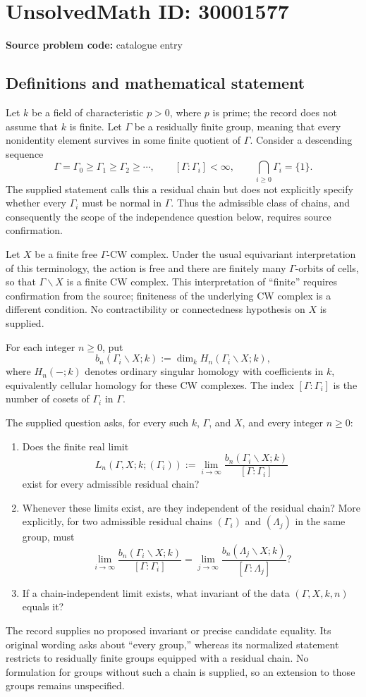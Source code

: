 \documentclass[11pt]{article}
\begin{document}
\section*{UnsolvedMath ID: 30001577}
\textbf{Source problem code:} catalogue entry
\subsection{Definitions and mathematical statement}
Let \(k\) be a field of characteristic \(p>0\), where \(p\) is prime; the record does not assume that \(k\) is finite. Let \(\Gamma\) be a residually finite group, meaning that every nonidentity element survives in some finite quotient of \(\Gamma\). Consider a descending sequence
\[
\Gamma=\Gamma_0\geq\Gamma_1\geq\Gamma_2\geq\cdots,
\qquad [\Gamma:\Gamma_i]<\infty,
\qquad \bigcap_{i\geq0}\Gamma_i=\{1\}.
\]
The supplied statement calls this a residual chain but does not explicitly specify whether every \(\Gamma_i\) must be normal in \(\Gamma\). Thus the admissible class of chains, and consequently the scope of the independence question below, requires source confirmation.

Let \(X\) be a finite free \(\Gamma\)-CW complex. Under the usual equivariant interpretation of this terminology, the action is free and there are finitely many \(\Gamma\)-orbits of cells, so that \(\Gamma\backslash X\) is a finite CW complex. This interpretation of ``finite'' requires confirmation from the source; finiteness of the underlying CW complex is a different condition. No contractibility or connectedness hypothesis on \(X\) is supplied.

For each integer \(n\geq0\), put
\[
b_n(\Gamma_i\backslash X;k)
:=\dim_k H_n(\Gamma_i\backslash X;k),
\]
where \(H_n(-;k)\) denotes ordinary singular homology with coefficients in \(k\), equivalently cellular homology for these CW complexes. The index \([\Gamma:\Gamma_i]\) is the number of cosets of \(\Gamma_i\) in \(\Gamma\).

The supplied question asks, for every such \(k\), \(\Gamma\), and \(X\), and every integer \(n\geq0\):
\begin{enumerate}
\item Does the finite real limit
\[
L_n(\Gamma,X;k;(\Gamma_i))
:=\lim_{i\to\infty}
\frac{b_n(\Gamma_i\backslash X;k)}{[\Gamma:\Gamma_i]}
\]
exist for every admissible residual chain?
\item Whenever these limits exist, are they independent of the residual chain? More explicitly, for two admissible residual chains \((\Gamma_i)\) and \((\Lambda_j)\) in the same group, must
\[
\lim_{i\to\infty}\frac{b_n(\Gamma_i\backslash X;k)}{[\Gamma:\Gamma_i]}
=
\lim_{j\to\infty}\frac{b_n(\Lambda_j\backslash X;k)}{[\Gamma:\Lambda_j]}?
\]
\item If a chain-independent limit exists, what invariant of the data \((\Gamma,X,k,n)\) equals it?
\end{enumerate}
The record supplies no proposed invariant or precise candidate equality. Its original wording asks about ``every group,'' whereas its normalized statement restricts to residually finite groups equipped with a residual chain. No formulation for groups without such a chain is supplied, so an extension to those groups remains unspecified.
\end{document}
